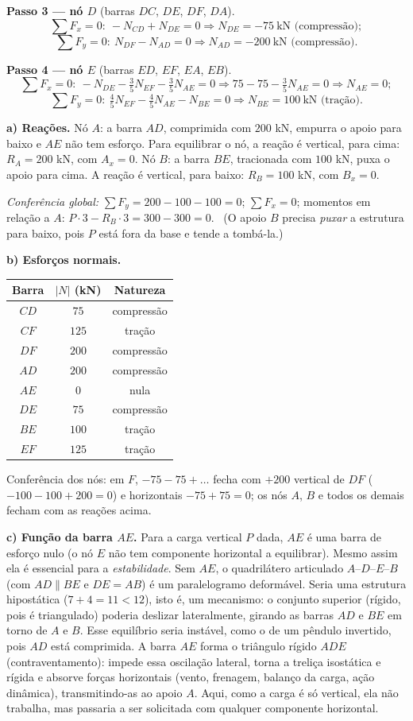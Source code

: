 \documentclass{article}%
\begin{document}
\textbf{Passo 3 --- nó $D$} (barras $DC$, $DE$, $DF$, $DA$).
\[
\sum F_x=0:\ -N_{CD}+N_{DE}=0\Rightarrow N_{DE}=-75\ \text{kN (compressão)};
\]
\[
\sum F_y=0:\ N_{DF}-N_{AD}=0\Rightarrow N_{AD}=-200\ \text{kN (compressão)}.
\]

\textbf{Passo 4 --- nó $E$} (barras $ED$, $EF$, $EA$, $EB$).
\[
\sum F_x=0:\ -N_{DE}-\tfrac35N_{EF}-\tfrac35N_{AE}=0\Rightarrow 75-75-\tfrac35N_{AE}=0\Rightarrow N_{AE}=0;
\]
\[
\sum F_y=0:\ \tfrac45N_{EF}-\tfrac45N_{AE}-N_{BE}=0\Rightarrow N_{BE}=100\ \text{kN (tração)}.
\]

\textbf{a) Reações.} 
Nó $A$: a barra $AD$, comprimida com $200$ kN, empurra o apoio para baixo e $AE$ não tem esforço. Para equilibrar o nó, a reação é vertical, para cima: $R_A=200$ kN, com $A_x=0$.
Nó $B$: a barra $BE$, tracionada com $100$ kN, puxa o apoio para cima. A reação é vertical, para baixo: $R_B=100$ kN, com $B_x=0$.

\textit{Conferência global:} $\sum F_y=200-100-100=0$; $\sum F_x=0$; momentos em relação a $A$: $P\cdot3-R_B\cdot3=300-300=0$. \checkmark\ (O apoio $B$ precisa \emph{puxar} a estrutura para baixo, pois $P$ está fora da base e tende a tombá-la.)

\textbf{b) Esforços normais.}

\begin{center}
\begin{tabular}{c|c|c}
Barra & $|N|$ (kN) & Natureza \\ \hline
$CD$ & $75$ & compressão \\
$CF$ & $125$ & tração \\
$DF$ & $200$ & compressão \\
$AD$ & $200$ & compressão \\
$AE$ & $0$ & nula \\
$DE$ & $75$ & compressão \\
$BE$ & $100$ & tração \\
$EF$ & $125$ & tração
\end{tabular}
\end{center}

Conferência dos nós: em $F$, $-75-75+\ldots$ fecha com $+200$ vertical de $DF$ ($-100-100+200=0$) e horizontais $-75+75=0$; os nós $A$, $B$ e todos os demais fecham com as reações acima.

\textbf{c) Função da barra $AE$.} Para a carga vertical $P$ dada, $AE$ é uma barra de esforço nulo (o nó $E$ não tem componente horizontal a equilibrar). Mesmo assim ela é essencial para a \emph{estabilidade}. Sem $AE$, o quadrilátero articulado $A$--$D$--$E$--$B$ (com $AD\parallel BE$ e $DE=AB$) é um paralelogramo deformável. Seria uma estrutura hipostática ($7+4=11<12$), isto é, um mecanismo: o conjunto superior (rígido, pois é triangulado) poderia deslizar lateralmente, girando as barras $AD$ e $BE$ em torno de $A$ e $B$. Esse equilíbrio seria instável, como o de um pêndulo invertido, pois $AD$ está comprimida. A barra $AE$ forma o triângulo rígido $ADE$ (contraventamento): impede essa oscilação lateral, torna a treliça isostática e rígida e absorve forças horizontais (vento, frenagem, balanço da carga, ação dinâmica), transmitindo-as ao apoio $A$. Aqui, como a carga é só vertical, ela não trabalha, mas passaria a ser solicitada com qualquer componente horizontal.
\end{document}
